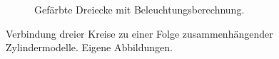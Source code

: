 \begin{figure} [hbtp]
\begin{subfigure}[t]{.4\textwidth}
		\caption{Gefärbte Dreiecke mit Beleuchtungsberechnung.}
		\label{subfig:MultiZylinder10SegmenteOpaque}
	\end{subfigure}
	\caption{Verbindung dreier Kreise zu einer Folge zusammenhängender Zylindermodelle. Eigene Abbildungen.}
	\label{fig:MultiZylinder10Segmente}
\end{figure}




